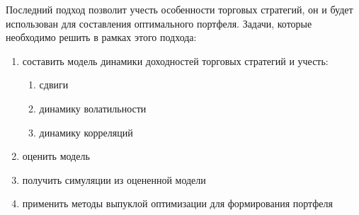 Последний подход позволит учесть особенности торговых стратегий, он и будет использован для составления оптимального портфеля. Задачи, которые необходимо решить в рамках этого подхода:
\begin{enumerate}
	\item составить модель динамики доходностей торговых стратегий и учесть:
	\begin{enumerate}
		\item сдвиги
		\item динамику волатильности
		\item динамику корреляций
	\end{enumerate}
	\item оценить модель
	\item получить симуляции из оцененной модели
	\item применить методы выпуклой оптимизации для формирования портфеля
\end{enumerate}